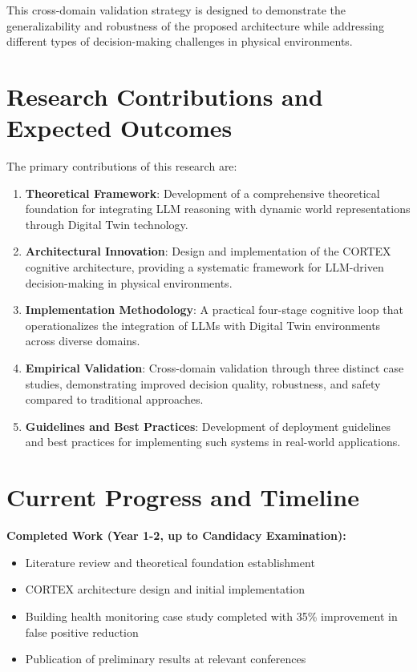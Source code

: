 This cross-domain validation strategy is designed to demonstrate the generalizability and robustness of the proposed architecture while addressing different types of decision-making challenges in physical environments.

\section{Research Contributions and Expected Outcomes}

The primary contributions of this research are:

\begin{enumerate}
    \item \textbf{Theoretical Framework}: Development of a comprehensive theoretical foundation for integrating LLM reasoning with dynamic world representations through Digital Twin technology.
    
    \item \textbf{Architectural Innovation}: Design and implementation of the CORTEX cognitive architecture, providing a systematic framework for LLM-driven decision-making in physical environments.
    
    \item \textbf{Implementation Methodology}: A practical four-stage cognitive loop that operationalizes the integration of LLMs with Digital Twin environments across diverse domains.
    
    \item \textbf{Empirical Validation}: Cross-domain validation through three distinct case studies, demonstrating improved decision quality, robustness, and safety compared to traditional approaches.
    
    \item \textbf{Guidelines and Best Practices}: Development of deployment guidelines and best practices for implementing such systems in real-world applications.
\end{enumerate}

\section{Current Progress and Timeline}

\textbf{Completed Work (Year 1-2, up to Candidacy Examination):}
\begin{itemize}
    \item Literature review and theoretical foundation establishment
    \item CORTEX architecture design and initial implementation
    \item Building health monitoring case study completed with 35\% improvement in false positive reduction
    \item Publication of preliminary results at relevant conferences
\end{itemize}

